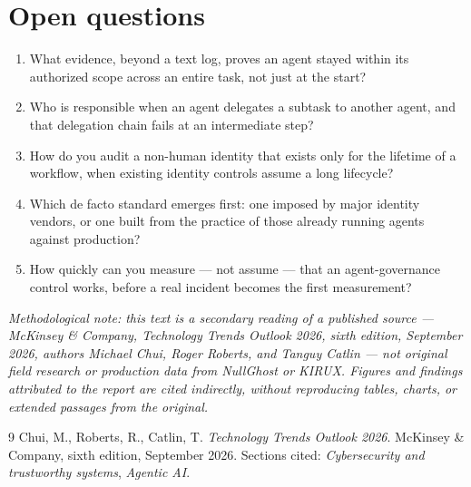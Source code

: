 \documentclass[10pt]{article}
\begin{document}
\section{Open questions}

\begin{enumerate}
\item What evidence, beyond a text log, proves an agent stayed within its authorized scope across an entire task, not just at the start?
\item Who is responsible when an agent delegates a subtask to another agent, and that delegation chain fails at an intermediate step?
\item How do you audit a non-human identity that exists only for the lifetime of a workflow, when existing identity controls assume a long lifecycle?
\item Which de facto standard emerges first: one imposed by major identity vendors, or one built from the practice of those already running agents against production?
\item How quickly can you measure --- not assume --- that an agent-governance control works, before a real incident becomes the first measurement?
\end{enumerate}

\vspace{0.6em}
{\small\itshape Methodological note: this text is a secondary reading of a published source --- McKinsey \& Company, \emph{Technology Trends Outlook 2026}, sixth edition, September 2026, authors Michael Chui, Roger Roberts, and Tanguy Catlin --- not original field research or production data from NullGhost or KIRUX. Figures and findings attributed to the report are cited indirectly, without reproducing tables, charts, or extended passages from the original.}

\begin{thebibliography}{9}
Chui, M., Roberts, R., Catlin, T. \emph{Technology Trends Outlook 2026}. McKinsey \& Company, sixth edition, September 2026. Sections cited: \emph{Cybersecurity and trustworthy systems}, \emph{Agentic AI}.
\end{thebibliography}
\end{document}
